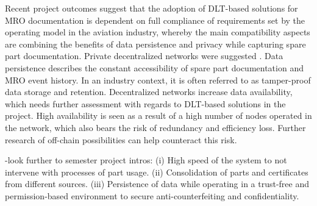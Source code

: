 Recent project outcomes suggest that the adoption of DLT-based solutions for MRO documentation is dependent on full compliance of requirements set by the operating model in the aviation industry, whereby the main compatibility aspects are combining the benefits of data persistence and privacy while capturing spare part documentation. Private decentralized networks were suggested \citep{Wickboldt2019BlockchainFW}. Data persistence describes the constant accessibility of spare part documentation and MRO event history. In an industry context, it is often referred to as tamper-proof data storage and retention. Decentralized networks increase data availability, which needs further assessment with regards to DLT-based solutions in the project. High availability is seen as a result of a high number of nodes operated in the network, which also bears the risk of redundancy and efficiency loss. Further research of off-chain possibilities can help counteract this risk.

-look further to semester project intros: 
(i) High speed of the system to not intervene with processes of part usage.
(ii) Consolidation of parts and certificates from different sources.
(iii) Persistence of data while operating in a trust-free and permission-based environment to secure anti-counterfeiting and confidentiality.

